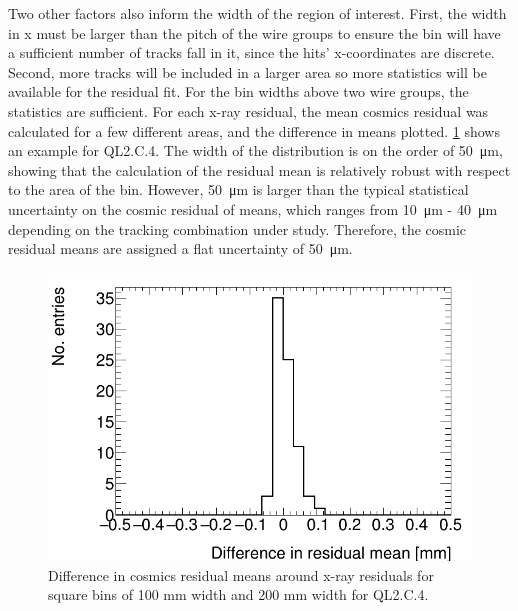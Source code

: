 Two other factors also inform the width of the region of interest. First, the width in x must be larger than the pitch of the wire groups to ensure the bin will have a sufficient number of tracks fall in it, since the hits' x-coordinates are discrete. Second, more tracks will be included in a larger area so more statistics will be available for the residual fit. For the bin widths above two wire groups, the statistics are sufficient. For each x-ray residual, the mean cosmics residual was calculated for a few different areas, and the difference in means plotted. \ref{fig:area_bin_size_mean_diff} shows an example for QL2.C.4. The width of the distribution is on the order of \SI{50}{\micro\meter}, showing that the calculation of the residual mean is relatively robust with respect to the area of the bin. However, \SI{50}{\micro\meter} is larger than the typical statistical uncertainty on the cosmic residual of means, which ranges from \SI{10}{\micro\meter} - \SI{40}{\micro\meter} depending on the tracking combination under study. Therefore, the cosmic residual means are assigned a flat uncertainty of \SI{50}{\micro\meter}. 

\begin{figure}
    \centering
    \includegraphics[width = \textwidth]{figures/compare_residual_fits_around_xrays_QL2C04_3100V_2021-05-20_100mm_width_bins_minus_QL2C04_3100V_2021-06-02_200mm_width_bins_means_difference.png}
    \caption{Difference in cosmics residual means around x-ray residuals for square bins of 100 mm width and 200 mm width for QL2.C.4.}
    \label{fig:area_bin_size_mean_diff}
\end{figure}